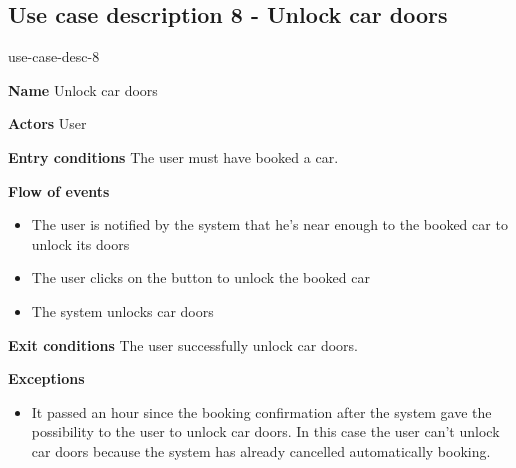 \subsection{Use case description 8 - Unlock car doors}
\begin{labeling}{use-case-desc-8}
		\item[\textbf{Name}] Unlock car doors
		\item[\textbf{Actors}] User
		\item[\textbf{Entry conditions}] The user must have booked a car.
		\item[\textbf{Flow of events}]
			\begin{itemize}
				\item[]
				\item The user is notified by the system that he's near enough to the booked car to unlock its doors
				\item The user clicks on the button to unlock the booked car
				\item The system unlocks car doors
			\end{itemize}
		\item[\textbf{Exit conditions}] The user successfully unlock car doors.
		\item[\textbf{Exceptions}]
			\begin{itemize}
				\item[]
				\item It passed an hour since the booking confirmation after the system gave the possibility to the user to unlock car doors. In this case the user can't unlock car doors because the system has already cancelled automatically booking.  
			\end{itemize}
	\end{labeling}
	
